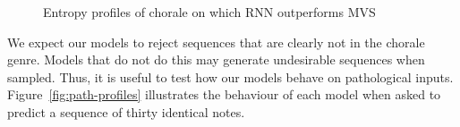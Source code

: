 \documentclass[12pt,a4paper,twoside,openright]{report}
\begin{document}
\begin{figure}[H]
\centering
{}

\caption{Entropy profiles of chorale on which RNN outperforms MVS}
\label{fig:als-der-profiles}
\end{figure}

We expect our models to reject sequences that are clearly not in the chorale
genre. Models that do not do this may generate undesirable sequences when
sampled. Thus, it is useful to test how our models behave on pathological
inputs. Figure~\ref{fig:path-profiles} illustrates the behaviour of each model
when asked to predict a sequence of thirty identical notes. 
\end{document}
